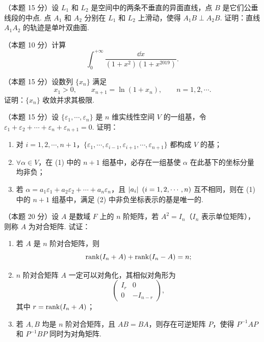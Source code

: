 
\begin{problems}

\item[一、]（本题 15 分）设 $L_1$ 和 $L_2$ 是空间中的两条不垂直的异面直线，点 $B$ 是它们公垂线段的中点. 点 $A_1$ 和 $A_2$ 分别在 $L_1$ 和 $L_2$ 上滑动，使得 $A_1B\perp A_2B$. 证明：直线 $A_1A_2$ 的轨迹是单叶双曲面.

\item[二、]（本题 10 分）计算
\[
  \int_0^{+\infty}\frac{\dd x}{(1+x^2)(1+x^{2019})}.
\]

\item[三、]（本题 15 分）设数列 $\{x_n\}$ 满足
\[
  x_1>0,\qquad x_{n+1}=\ln(1+x_n),\qquad n=1,2,\cdots.
\]
证明：$\{x_n\}$ 收敛并求其极限.

\item[四、]（本题 15 分）设 $\{\varepsilon_1,\cdots,\varepsilon_n\}$ 是 $n$ 维实线性空间 $V$ 的一组基，令 $\varepsilon_1+\varepsilon_2+\cdots+\varepsilon_n+\varepsilon_{n+1}=0$. 证明：
\begin{enumerate}
  \item 对 $i=1,2,\cdots,n+1$，$\{\varepsilon_1,\cdots,\varepsilon_{i-1},\varepsilon_{i+1},\cdots,\varepsilon_{n+1}\}$ 都构成 $V$ 的基；
  \item $\forall\alpha\in V$，在 (1) 中的 $n+1$ 组基中，必存在一组基使 $\alpha$ 在此基下的坐标分量均非负；
  \item 若 $\alpha=a_1\varepsilon_1+a_2\varepsilon_2+\cdots+a_n\varepsilon_n$，且 $\left|a_i\right|\ (i=1,2,\cdots,n)$ 互不相同，则在 (1) 中的 $n+1$ 组基中，满足 (2) 中非负坐标表示的基是唯一的.
\end{enumerate}

\item[五、]（本题 20 分）设 $A$ 是数域 $F$ 上的 $n$ 阶矩阵，若 $A^2=I_n$（$I_n$ 表示单位矩阵），则称 $A$ 为对合矩阵. 试证：
\begin{enumerate}
  \item 若 $A$ 是 $n$ 阶对合矩阵，则
  \[
    \operatorname{rank}(I_n+A)+\operatorname{rank}(I_n-A)=n;
  \]
  \item $n$ 阶对合矩阵 $A$ 一定可以对角化，其相似对角形为
  \[
    \begin{pmatrix}
      I_r & 0\\
      0 & -I_{n-r}
    \end{pmatrix},
  \]
  其中 $r=\operatorname{rank}(I_n+A)$；
  \item 若 $A,B$ 均是 $n$ 阶对合矩阵，且 $AB=BA$，则存在可逆矩阵 $P$，使得 $P^{-1}AP$ 和 $P^{-1}BP$ 同时为对角矩阵.
\end{enumerate}


\end{problems}
